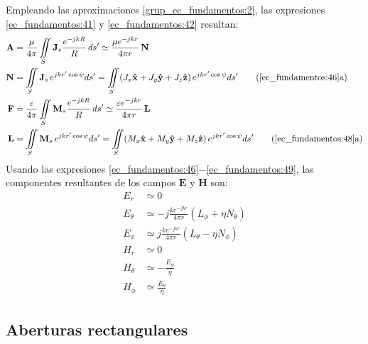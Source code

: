 Empleando las aproximaciones \eqref{grup_ec_fundamentos:2}, las expresiones \eqref{ec_fundamentos:41} y \eqref{ec_fundamentos:42} resultan:
\begin{align}
\mathbf{A} &= \frac{\mu}{4\pi}\iint\limits_S\mathbf{J}_s\frac{e^{-jkR}}{R}\,ds' \simeq \frac{\mu e^{-jkr}}{4\pi r}\,\mathbf{N}
\label{ec_fundamentos:46}\\
\mathbf{N} &= \iint\limits_S\mathbf{J}_s\,e^{jkr'\cos\psi}ds' = \iint\limits_S\!\left(J_x\versor{x} + J_y\versor{y} + J_z\versor{z}\right)e^{jkr'\cos\psi}ds'
\tag{\ref{ec_fundamentos:46}a}
\label{ec_fundamentos:47}\\
\mathbf{F} &= \frac{\varepsilon}{4\pi}\iint\limits_S\mathbf{M}_s\frac{e^{-jkR}}{R}\,ds' \simeq \frac{\varepsilon e^{-jkr}}{4\pi r}\,\mathbf{L}
\label{ec_fundamentos:48}\\
\mathbf{L} &= \iint\limits_S\mathbf{M}_s\,e^{jkr'\cos\psi}ds' = \iint\limits_S\!\left(M_x\versor{x} + M_y\versor{y} + M_z\versor{z}\right)e^{jkr'\cos\psi}ds'
\tag{\ref{ec_fundamentos:48}a}
\label{ec_fundamentos:49}
\end{align}
Usando las expresiones \eqref{ec_fundamentos:46}$-$\eqref{ec_fundamentos:49}, las componentes resultantes de los campos $\mathbf{E}$ y $\mathbf{H}$ son:
\begin{subequations}
\label{grup_ec_fundamentos:3}
\begin{align}
E_r &\simeq 0
\label{ec_fundamentos:50}\\
E_{\theta} &\simeq - j\frac{ke^{-jkr}}{4\pi r}\left(L_{\phi} + \eta N_{\theta}\right)
\label{ec_fundamentos:51}\\
E_{\phi} &\simeq j\frac{ke^{-jkr}}{4\pi r}\left(L_{\theta} - \eta N_{\phi}\right)
\label{ec_fundamentos:52}\\
H_r &\simeq 0
\label{ec_fundamentos:53}\\
H_{\theta} &\simeq - \frac{E_{\phi}}{\eta}
\label{ec_fundamentos:54}\\
H_{\phi} &\simeq \frac{E_{\theta}}{\eta}
\label{ec_fundamentos:55}
\end{align}
\end{subequations}

\subsection{Aberturas rectangulares}
\label{subsec_fundamentos_aber_rect}

